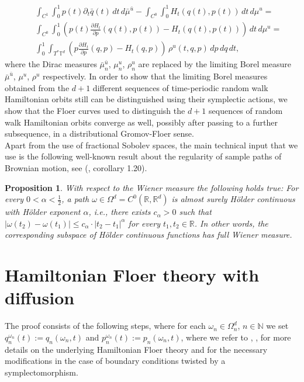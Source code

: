 \documentclass[a4paper,11pt]{amsart}
\newcommand{\NN}{\mathbb{N}}
\newcommand{\RR}{\mathbb{R}}
\newcommand{\TT}{\mathbb{T}}
\newtheorem{proposition}[theorem]{Proposition}
\begin{document}
\begin{eqnarray*}
&&\int_{C^1}\int_0^1p(t)\partial_t\bar{q}(t)\,dt\,d\bar{\mu}^{\bar{u}}-\int_{C^0}\int_0^1 H_t(q(t),p(t))\,dt\,d\mu^u =\\
&&\int_{C^0}\int_0^1 \left(p(t)\frac{\partial H_t}{\partial p}(q(t),p(t))- H_t(q(t),p(t))\right)\,dt\,d\mu^u =\\
&&\int_0^1\int_{T^*\TT^d} \left(p\frac{\partial H_t}{\partial p}(q,p)- H_t(q,p)\right)\,\rho^u(t,q,p) \,dp\,dq \,dt,
\end{eqnarray*}
where the Dirac measures $\bar{\mu}^{\bar{u}}_n$, $\mu^u_n$, $\rho^u_n$ are replaced by the limiting Borel measure $\bar{\mu}^{\bar{u}}$, $\mu^u$, $\rho^u$ respectively. In order to show that the limiting Borel measures obtained from the $d+1$ different sequences of time-periodic random walk Hamiltonian orbits still can be distinguished using their symplectic actions, we show that the Floer curves used to distinguish the $d+1$ sequences of random walk Hamiltonian orbits converge as well, possibly after passing to a further subsequence, in a distributional Gromov-Floer sense.\\
\indent Apart from the use of fractional Sobolev spaces, the main technical input that we use is the following well-known result about the regularity of sample paths of Brownian motion, see (\cite{MY}, corollary 1.20).
\begin{proposition}\label{regularity}
With respect to the Wiener measure the following holds true: For every $0<\alpha<\frac{1}{2}$, a path $\omega\in\Omega^d=C^0(\RR,\RR^d)$ is almost surely H\"older continuous with H\"older exponent $\alpha$, i.e., there exists $c_\alpha>0$ such that $|\omega(t_2)-\omega(t_1)|\leq c_\alpha\cdot |t_2-t_1|^\alpha$ for every $t_1,t_2\in\RR$. In other words, the corresponding subspace of H\"older continuous functions has full Wiener measure.
\end{proposition}

\section{Hamiltonian Floer theory with diffusion}
The proof consists of the following steps, where for each $\omega_n\in\Omega_n^d$, $n\in\NN$ we set $q_n^{\omega_n}(t):=q_n(\omega_n,t)$ and $p_n^{\omega_n}(t):=p_n(\omega_n,t)$, where we refer to \cite{AD}, \cite{AH}, \cite{Sch} for more details on the underlying Hamiltonian Floer theory and \cite{DS} for the necessary modifications in the case of boundary conditions twisted by a symplectomorphism. \\
\end{document}
